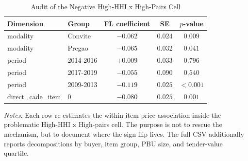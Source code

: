 \begin{table}[htbp]
\centering
\caption{Audit of the Negative High-HHI x High-Pairs Cell}
\label{tab:negative_cell_audit}
\begin{threeparttable}
\small
\begin{tabular}{llccc}
\toprule
Dimension & Group & FL coefficient & SE & $p$-value \\
\midrule
modality & Convite & $-0.062$ & $0.024$ & $0.009$ \\
modality & Pregao & $-0.065$ & $0.032$ & $0.041$ \\
period & 2014-2016 & $+0.009$ & $0.033$ & $0.796$ \\
period & 2017-2019 & $-0.055$ & $0.090$ & $0.540$ \\
period & 2009-2013 & $-0.119$ & $0.025$ & $<0.001$ \\
direct\_cade\_item & 0 & $-0.080$ & $0.025$ & $0.001$ \\
\bottomrule
\end{tabular}
\begin{tablenotes}
\small
\item \textit{Notes:} Each row re-estimates the within-item price association inside the problematic High-HHI x High-pairs cell. The purpose is not to rescue the mechanism, but to document where the sign flip lives. The full CSV additionally reports decompositions by buyer, item group, PBU size, and tender-value quartile.
\end{tablenotes}
\end{threeparttable}
\end{table}

